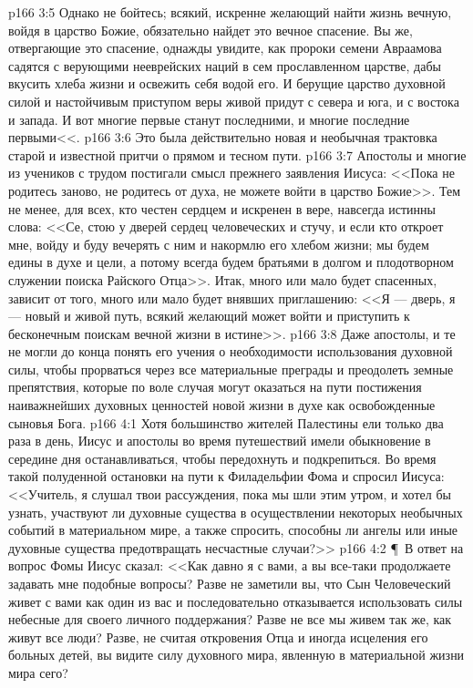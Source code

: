 \vs p166 3:5 Однако не бойтесь; всякий, искренне желающий найти жизнь вечную, войдя в царство Божие, обязательно найдет это вечное спасение. Вы же, отвергающие это спасение, однажды увидите, как пророки семени Авраамова садятся с верующими нееврейских наций в сем прославленном царстве, дабы вкусить хлеба жизни и освежить себя водой его. И берущие царство духовной силой и настойчивым приступом веры живой придут с севера и юга, и с востока и запада. И вот многие первые станут последними, и многие последние первыми<<.
\vs p166 3:6 Это была действительно новая и необычная трактовка старой и известной притчи о прямом и тесном пути.
\vs p166 3:7 Апостолы и многие из учеников с трудом постигали смысл прежнего заявления Иисуса: <<Пока не родитесь заново, не родитесь от духа, не можете войти в царство Божие>>. Тем не менее, для всех, кто честен сердцем и искренен в вере, навсегда истинны слова: <<Се, стою у дверей сердец человеческих и стучу, и если кто откроет мне, войду и буду вечерять с ним и накормлю его хлебом жизни; мы будем едины в духе и цели, а потому всегда будем братьями в долгом и плодотворном служении поиска Райского Отца>>. Итак, много или мало будет спасенных, зависит от того, много или мало будет внявших приглашению: <<Я --- дверь, я --- новый и живой путь, всякий желающий может войти и приступить к бесконечным поискам вечной жизни в истине>>.
\vs p166 3:8 Даже апостолы, и те не могли до конца понять его учения о необходимости использования духовной силы, чтобы прорваться через все материальные преграды и преодолеть земные препятствия, которые по воле случая могут оказаться на пути постижения наиважнейших духовных ценностей новой жизни в духе как освобожденные сыновья Бога.
\vs p166 4:1 Хотя большинство жителей Палестины ели только два раза в день, Иисус и апостолы во время путешествий имели обыкновение в середине дня останавливаться, чтобы передохнуть и подкрепиться. Во время такой полуденной остановки на пути к Филадельфии Фома и спросил Иисуса: <<Учитель, я слушал твои рассуждения, пока мы шли этим утром, и хотел бы узнать, участвуют ли духовные существа в осуществлении некоторых необычных событий в материальном мире, а также спросить, способны ли ангелы или иные духовные существа предотвращать несчастные случаи?>>
\vs p166 4:2 \P\ В ответ на вопрос Фомы Иисус сказал: <<Как давно я с вами, а вы все\hyp{}таки продолжаете задавать мне подобные вопросы? Разве не заметили вы, что Сын Человеческий живет с вами как один из вас и последовательно отказывается использовать силы небесные для своего личного поддержания? Разве не все мы живем так же, как живут все люди? Разве, не считая откровения Отца и иногда исцеления его больных детей, вы видите силу духовного мира, явленную в материальной жизни мира сего?
